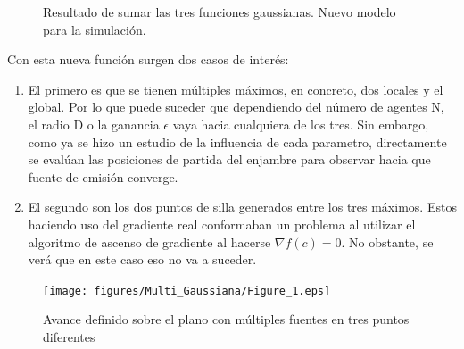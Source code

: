 \begin{figure}[H]
  \begin{center}
    \caption{Resultado de sumar las tres funciones gaussianas. Nuevo modelo para la simulación.}
    \label{New_Gaussiana}
  \end{center}
\end{figure}
\newpage
Con esta nueva función surgen dos casos de interés:

\begin{enumerate}
	\item El primero es que se tienen múltiples máximos, en concreto, dos locales y el global. Por lo que puede suceder que dependiendo del número de agentes N, el radio D o la ganancia $\epsilon$ vaya hacia cualquiera de los tres. Sin embargo, como ya se hizo un estudio de la influencia de cada parametro, directamente se evalúan las posiciones de partida del enjambre para observar hacia que fuente de emisión converge.
	\item El segundo son los dos puntos de silla generados entre los tres máximos. Estos haciendo uso del gradiente real conformaban un problema al utilizar el algoritmo de ascenso de gradiente al hacerse $\nabla{f\left(c\right)}=0$. No obstante, se verá que en este caso eso no va a suceder.
\end{enumerate}
	
\begin{figure}[H]
\centering
\texttt{[image: figures/Multi\_Gaussiana/Figure\_1.eps]}
\caption{Avance definido sobre el plano con múltiples fuentes en tres puntos diferentes} \label{Multiples_Fuentes}
\end{figure}

